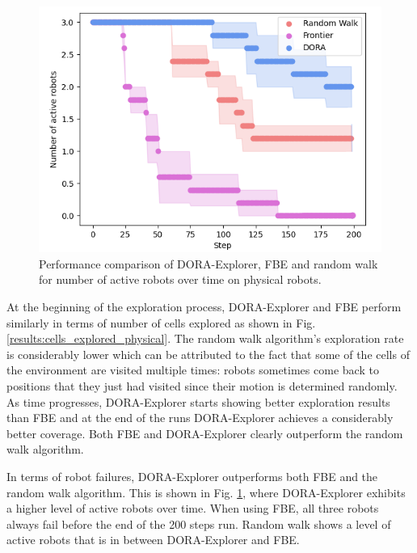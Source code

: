 \documentclass[letterpaper, 10 pt, conference]{ieeeconf}
\begin{document}
\begin{figure}[h]
    \centering
    \includegraphics[width=0.95\columnwidth]{images/activerobots_real.png}
    \caption{Performance comparison of DORA-Explorer, FBE and random walk for number of active robots over time on physical robots.}
    \label{results:active_robots_physical}
\end{figure}

At the beginning of the exploration process, DORA-Explorer and FBE perform
similarly in terms of number of cells explored as shown in
Fig. \ref{results:cells_explored_physical}. The random walk
algorithm's exploration rate is considerably lower which can be
attributed to the fact that some of the cells of the environment are
visited multiple times: robots sometimes come back to positions that
they just had visited since their motion is determined randomly. As
time progresses, DORA-Explorer starts showing better exploration results than
FBE and at the end of the runs DORA-Explorer achieves a considerably better
coverage. Both FBE and DORA-Explorer clearly outperform the random walk
algorithm.

In terms of robot failures, DORA-Explorer outperforms both FBE and the random
walk algorithm. This is shown in
Fig. \ref{results:active_robots_physical}, where DORA-Explorer exhibits a
higher level of active robots over time. When using FBE, all three
robots always fail before the end of the 200 steps run. Random walk
shows a level of active robots that is in between DORA-Explorer and FBE.
\end{document}
